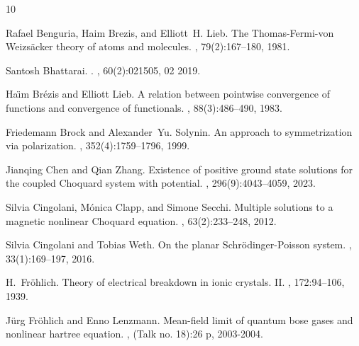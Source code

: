 \documentclass[12pt,a4paper]{article}
\numberwithin{equation}{section}
\begin{document}
\begin{thebibliography}{10}

Rafael Benguria, Haim Brezis, and Elliott~H. Lieb.
\newblock The {T}homas-{F}ermi-von {W}eizs{\"a}cker theory of atoms and
  molecules.
, 79(2):167--180, 1981.

Santosh Bhattarai.
.
, 60(2):021505, 02 2019.

Ha\"{\i}m Br\'{e}zis and Elliott Lieb.
\newblock A relation between pointwise convergence of functions and convergence
  of functionals.
, 88(3):486--490, 1983.

Friedemann Brock and Alexander~Yu. Solynin.
\newblock An approach to symmetrization via polarization.
,
  352(4):1759--1796, 1999.

Jianqing Chen and Qian Zhang.
\newblock Existence of positive ground state solutions for the coupled
  {Choquard} system with potential.
, 296(9):4043--4059, 2023.

Silvia Cingolani, M{\'o}nica Clapp, and Simone Secchi.
\newblock Multiple solutions to a magnetic nonlinear {C}hoquard equation.
,
  63(2):233--248, 2012.

Silvia Cingolani and Tobias Weth.
\newblock On the planar {Schr{\"o}dinger}-{Poisson} system.
, 33(1):169--197, 2016.

H.~Fr{\"o}hlich.
\newblock Theory of electrical breakdown in ionic crystals. {II}.
, 172:94--106, 1939.

J{\"u}rg Fr{\"o}hlich and Enno Lenzmann.
\newblock Mean-field limit of quantum bose gases and nonlinear hartree
  equation.
, (Talk no.
  18):26 p, 2003-2004.


\end{thebibliography}
\end{document}
